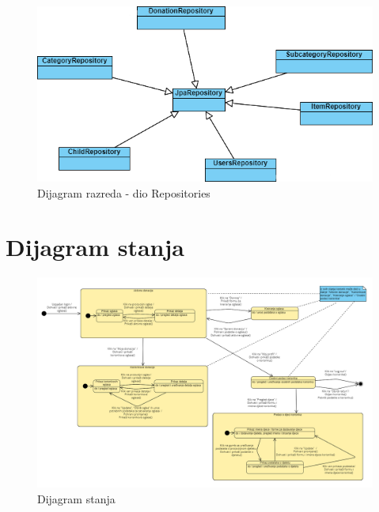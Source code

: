 			\begin{figure}[H]
				\includegraphics[width=\textwidth,height=0.4\textheight]{dijagrami/Repozitoriji.png}
				\centering
				\caption{Dijagram razreda - dio Repositories}
				\label{fig:Repositories}
			\end{figure}

			
			
			
			
			\eject
		
		\section{Dijagram stanja}
			
			
			
			\begin{figure}[H]
				\includegraphics[width=\textwidth,height=0.5\textheight]{dijagrami/Dijagram stanja.png}
				\centering
				\caption{Dijagram stanja}
				\label{fig:StateDiagram}
			\end{figure}
			
